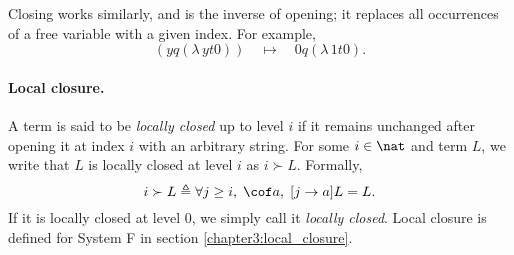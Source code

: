 Closing works similarly, and is the inverse of opening; it replaces all occurrences of a free
variable with a given index. For example,
\begin{equation*}
  [0 \leftarrow y] (y q (\lambda \, y t 0)) \quad \mapsto \quad 0 q (\lambda \, 1 t 0).
\end{equation*}

\paragraph*{Local closure.} A term is said to be \textit{locally closed} up to level $i$ if it
remains unchanged after opening it at index $i$ with an arbitrary string. For some $i \in \nat$ and
term $L$, we write that $L$ is locally closed at level $i$ as $i \succ L$. Formally,
\begin{equation}
  \label{equation:local_closure}
  i \succ L \triangleq \forall j \geq i, \; \cof a , \; [j \to a] L = L.
\end{equation}
If it is locally closed at level $0$, we simply call it \textit{locally closed}. Local closure is
defined for System F in section \ref{chapter3:local_closure}.
